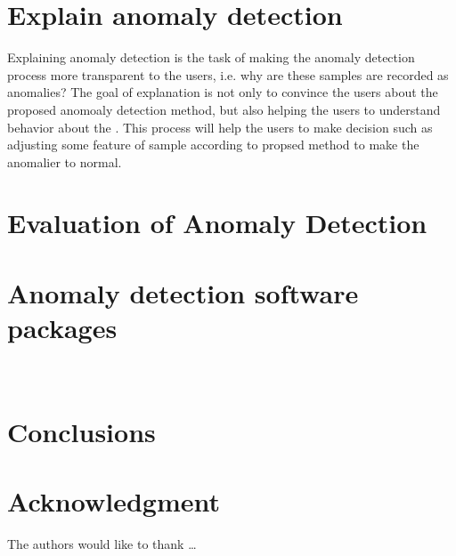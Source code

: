 \section{Explain anomaly detection}
Explaining anomaly detection is the task of making 
the anomaly detection process more transparent to the users,
i.e. why are these samples are recorded as anomalies?  
The  goal of explanation is not only to 
convince the users about the proposed anomoaly detection method,
but also helping the users to understand behavior about
the .
This process will help the users to make decision such as
adjusting some feature of sample according to propsed method to 
make the anomalier to normal.


\section{Evaluation of Anomaly Detection}
\subsection{}

\section{Anomaly detection software packages}~\label{sec:tools}


\section{Conclusions} \label{sec-conclusions}

\blindtext

\section*{Acknowledgment}

\lipsum[1]


The authors would like to thank \ldots

